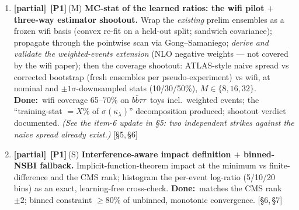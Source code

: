 \documentclass[11pt]{article}
\newcommand{\kl}{\ensuremath{\kappa_\lambda}}
\newcommand{\bbtt}{\ensuremath{b\bar b\tau\tau}}
\newcommand{\priO}{\textcolor{orange!85!black}{\textbf{[P1]}}}
\newcommand{\eff}[1]{{\footnotesize\textcolor{gray!65!black}{(#1)}}}
\newcommand{\sref}[1]{ {\footnotesize\textcolor{gray!60!black}{[#1]}}}
\newcommand{\dw}{\textcolor{green!30!black}{\textbf{Done:}}~}
\newcommand{\stPart}{\textcolor{orange!90!black}{\textbf{[partial]}}}
\begin{document}
\begin{enumerate}[resume,leftmargin=2.6em]
{{\kl\ grid and re-run with systematics.)}} \sref{\S6}
\item \stPart\ \priO\,\eff{M} \textbf{MC-stat of the learned ratios: the wifi pilot $+$ three-way estimator
shootout.} Wrap the \emph{existing} prelim ensembles as a frozen wifi basis (convex re-fit on a held-out split;
sandwich covariance); propagate through the pointwise scan via Gong--Samaniego; \emph{derive and validate the
weighted-events extension} (NLO negative weights --- not covered by the wifi paper); then the coverage shootout:
ATLAS-style naive spread vs corrected bootstrap (fresh ensembles per pseudo-experiment) vs wifi, at nominal and
$\pm1\sigma$-downsampled stats (10/30/50\%), $M\in\{8,16,32\}$. \dw wifi coverage 65--70\% on \bbtt\ toys incl.\
weighted events; the ``training-stat $=X\%$ of $\sigma(\kl)$'' decomposition produced; shootout verdict documented.
\textcolor{orange!75!black}{\emph{\small(See the item-6 update in \S5: two independent strikes against the naive
spread already exist.)}} \sref{\S5,\,\S6}
\item \stPart\ \priO\,\eff{S} \textbf{Interference-aware impact definition $+$ binned-NSBI fallback.}
Implicit-function-theorem impact at the minimum vs finite-difference and the CMS rank; histogram the per-event
log-ratio (5/10/20 bins) as an exact, learning-free cross-check. \dw matches the CMS rank $\pm2$; binned constraint
$\ge80\%$ of unbinned, monotonic convergence. \sref{\S6,\,\S7}
\end{enumerate}
\end{document}
